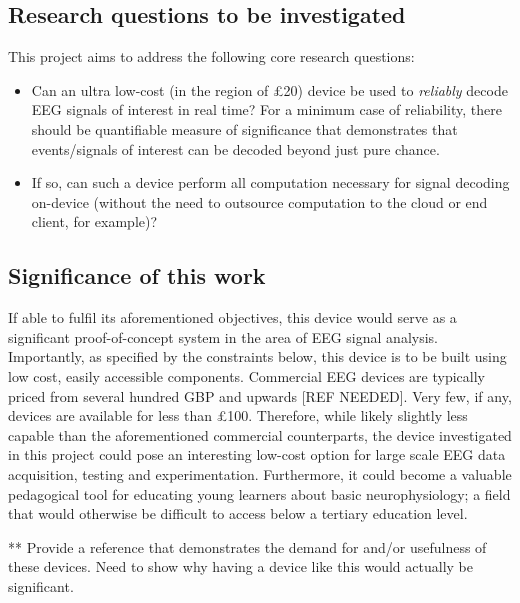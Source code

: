 \subsection{Research questions to be investigated}
This project aims to address the following core research questions: 
\begin{itemize}
    \item Can an ultra low-cost (in the region of £20) device be used to \textit{reliably} decode EEG signals of interest in real time? For a minimum case of reliability, there should be quantifiable measure of significance that demonstrates that events/signals of interest can be decoded beyond just pure chance. 
    \item If so, can such a device perform all computation necessary for signal decoding on-device (without the need to outsource computation to the cloud or end client, for example)? 
\end{itemize}
\subsection{Significance of this work}
If able to fulfil its aforementioned objectives, this device would serve as a significant proof-of-concept system in the area of EEG signal analysis. Importantly, as specified by the constraints below, this device is to be built using low cost, easily accessible components. Commercial EEG devices are typically priced from several hundred GBP and upwards [REF NEEDED]. Very few, if any, devices are available for less than £100. Therefore, while likely slightly less capable than the aforementioned commercial counterparts, the device investigated in this project could pose an interesting low-cost option for large scale EEG data acquisition, testing and experimentation. Furthermore, it could become a valuable pedagogical tool for educating young learners about basic neurophysiology; a field that would otherwise be difficult to access below a tertiary education level.

** Provide a reference that demonstrates the demand for and/or usefulness of these devices. Need to show why having a device like this would actually be significant.


